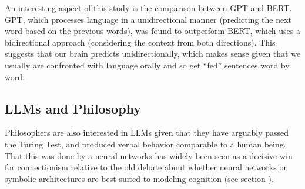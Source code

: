 An interesting aspect of this study is the comparison between GPT and BERT. GPT, which processes language in a unidirectional manner (predicting the next word based on the previous words), was found to outperform BERT, which uses a bidirectional approach (considering the context from both directions). This suggests that our brain predicts unidirectionally, which  makes sense given that we usually are confronted with language orally and so get ``fed'' sentences word by word. 


\subsection{LLMs and Philosophy}\label{llmPhilosophy}


Philosophers are also interested in LLMs given that they have arguably passed the Turing Test, and produced verbal behavior comparable to a human being. That this was done by a neural networks has widely been seen as a decisive win for connectionism relative to the old debate about whether neural networks or symbolic architectures are best-suited to modeling cognition (see section ).  

